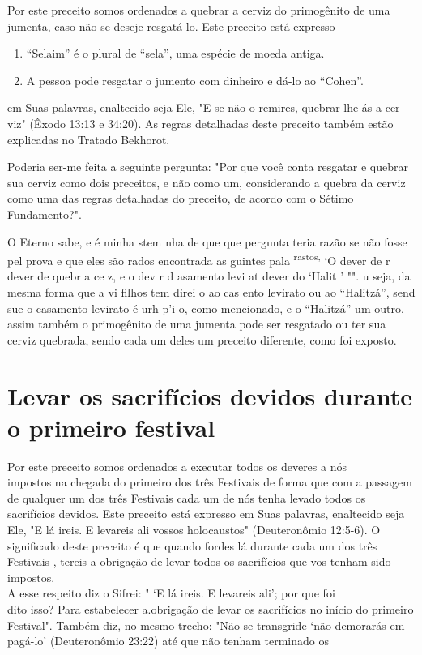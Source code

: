Por este preceito somos ordenados a quebrar a cerviz do primogê­nito de
uma jumenta, caso não se deseje resgatá-lo. Este preceito está expresso


\begin{enumerate}
\def\labelenumi{\arabic{enumi}.}
\setcounter{enumi}{102}
\item
 
 ``Selaim'' é o plural de ``sela'', uma espécie de moeda antiga.
 
\item
 
 A pessoa pode resgatar o jumento com dinheiro e dá-lo ao ``Cohen''.
 
\end{enumerate}

em Suas palavras, enaltecido seja Ele, "E se não o remires,
quebrar-lhe-ás a cer­viz" (Êxodo 13:13 e 34:20). As regras detalhadas
deste preceito também estão explicadas no Tratado Bekhorot.

Poderia ser-me feita a seguinte pergunta: "Por que você conta resga­tar
e quebrar sua cerviz como dois preceitos, e não como um, considerando a
quebra da cerviz como uma das regras detalhadas do preceito, de acordo
com o Sétimo Fundamento?".

O Eterno sabe, e é minha stem nha de que que pergunta teria razão se não
fosse pel prova e que eles são rados encontrada as guintes pala
\textsuperscript{rastos,} `O dever de r dever de quebr a ce z, e o dev r
d asamento levi at dever do `Halit ' "". u seja, da mesma forma que a vi
filhos tem direi o ao cas ento levirato ou ao ``Halitzá'', send sue o
casamen­to levirato é urh p'i o, como mencionado, e o ``Halitzá'' um
outro, assim também o primogênito de uma jumenta pode ser resgatado ou
ter sua cerviz quebrada, sendo cada um deles um preceito diferente, como
foi exposto.

\section{Levar os sacrifícios devidos durante o primeiro festival}


Por este preceito somos ordenados a executar todos os deveres a nós\\
impostos na chegada do primeiro dos três Festivais de forma que com a
passagem
de qualquer um dos três Festivais cada um de nós tenha levado todos
os\\
sacrifícios devidos. Este preceito está expresso em Suas palavras,
enaltecido seja\\
Ele, "E lá ireis. E levareis ali vossos holocaustos" (Deuteronômio
12:5-6). O significado
deste preceito é que quando fordes lá durante cada um dos três
Festivais
, tereis a obrigação de levar todos os sacrifícios que vos tenham
sido impostos.\\
A esse respeito diz o Sifrei: " `E lá ireis. E levareis ali'; por que
foi\\
dito isso? Para estabelecer a.obrigação de levar os sacrifícios no
início do primeiro
Festival". Também diz, no mesmo trecho: "Não se transgride `não
demorarás
em pagá-lo' (Deuteronômio 23:22) até que não tenham terminado os


